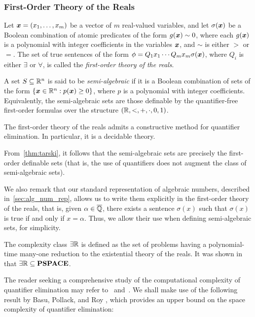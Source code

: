 \subsubsection{First-Order Theory of the Reals}

Let $\boldsymbol{x}=(x_1,\ldots,x_m)$ be a vector of $m$ real-valued
variables, and let $\sigma(\boldsymbol{x})$ be a Boolean combination
of atomic predicates of the form $g(\boldsymbol{x})\sim 0$, where each
$g(\boldsymbol{x})$ is a polynomial with integer coefficients in the
variables $\boldsymbol{x}$, and $\sim$ is either $>$ or $=$.
The set of true sentences of the form $\phi=Q_1 x_1 \cdots Q_m x_m
\sigma(\boldsymbol{x})$, where $Q_i$ is either $\exists$ or
$\forall$, is called the \emph{first-order theory of the reals}.

A set $S \subseteq \mathbb{R}^{n}$ is said to be \emph{semi-algebraic} if it is a Boolean combination of sets of the form $\lbrace \boldsymbol{x} \in \mathbb{R}^{n}: p(\boldsymbol{x}) \geq 0\rbrace$, where $p$ is a polynomial with integer coefficients. Equivalently, the semi-algebraic sets are those definable by the quantifier-free first-order formulas over the structure $(\mathbb{R}, <, +, \cdot, 0, 1)$.

\begin{theorem}
\label{thm:tarski}
The first-order theory of the reals admits a constructive method for quantifier elimination. In particular, it is a decidable theory.~\cite{Tar51}
\end{theorem}

From~\cref{thm:tarski}, it follows that the semi-algebraic sets are precisely the first-order definable sets (that is, the use of quantifiers does not augment the class of semi-algebraic sets).

We also remark that our standard representation of algebraic numbers, described in~\cref{sec:alg_num_rep}, allows us to write them explicitly in the first-order theory of the reals, that is, given $\alpha\in\overline{\mathbb{Q}}$, there exists a sentence $\sigma(x)$ such that $\sigma(x)$ is true if and only if $x=\alpha$. Thus, we allow their use when defining semi-algebraic sets, for simplicity.

The complexity class $\exists\mathbb{R}$ is defined as the set of problems having a polynomial-time many-one reduction to the existential theory of the reals. It was shown in~\cite{Canny88} that $\exists\mathbb{R}\subseteq \textbf{PSPACE}$.

The reader seeking a comprehensive study of the computational complexity of quantifier elimination may refer to~\cite{Renegar} and~\cite{BPR06}. We shall make use of the following result by Basu, Pollack, and Roy
\cite{BasuPR96}, which provides an upper bound on the space complexity of quantifier elimination:

